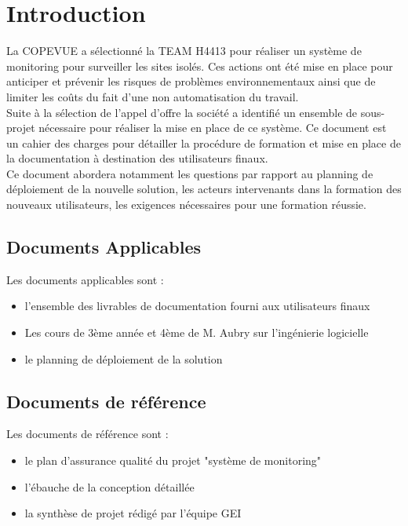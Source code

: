 \section{Introduction}

La COPEVUE a sélectionné la TEAM H4413 pour réaliser un système de monitoring pour 
surveiller les sites isolés. Ces actions ont été mise en place pour anticiper et prévenir
les risques de problèmes environnementaux ainsi que de limiter les coûts du fait
d'une non automatisation du travail. \\

Suite à la sélection de l'appel d'offre la société a identifié un ensemble de sous-projet
nécessaire pour réaliser la mise en place de ce système. Ce document est un cahier des charges
pour détailler la procédure de formation et mise en place de la documentation à destination des 
utilisateurs finaux. \\

Ce document abordera notamment les questions par rapport au planning de déploiement 
de la nouvelle solution, les acteurs intervenants dans la formation des nouveaux 
utilisateurs, les exigences nécessaires pour une formation réussie.


\subsection{Documents Applicables}

Les documents applicables sont :
\begin{itemize}
\item l'ensemble des livrables de documentation fourni aux utilisateurs finaux
\item Les cours de 3ème année et 4ème de M. Aubry sur l'ingénierie logicielle
\item le planning de déploiement de la solution
\end{itemize}

\subsection{Documents de référence}

Les documents de référence sont : 
\begin{itemize}
\item le plan d'assurance qualité du projet "système de monitoring"
\item l'ébauche de la conception détaillée
\item la synthèse de projet rédigé par l'équipe GEI
\end{itemize}

